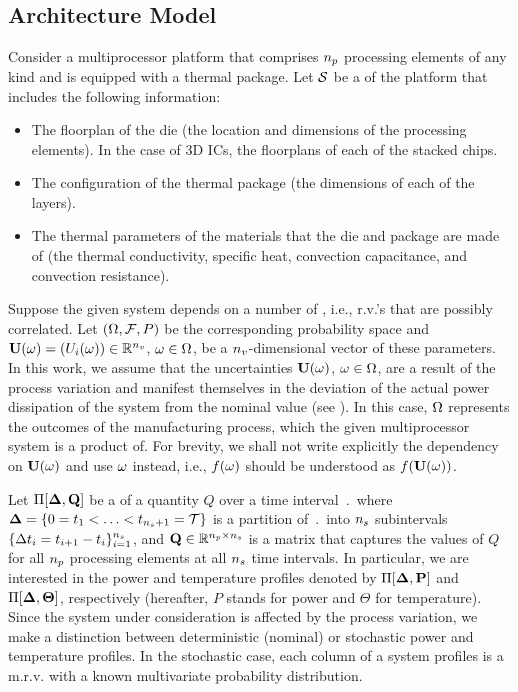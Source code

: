 \subsection{Architecture Model}  
Consider a multiprocessor platform that comprises ${n_p}$ processing elements of any kind and is equipped with a thermal package. Let $\mathcal{S}$ be a  of the platform that includes the following information:
\begin{itemize}
  \item The floorplan of the die (the location and dimensions of the processing elements). In the case of 3D ICs, the floorplans of each of the stacked chips.
  \item The configuration of the thermal package (the dimensions of each of the layers).
  \item The thermal parameters of the materials that the die and package are made of (the thermal conductivity, specific heat, convection capacitance, and convection resistance).
\end{itemize}

Suppose the given system depends on a number of , i.e., r.v.'s that are possibly correlated. Let $(\Omega, \mathcal{F}, P)$ be the corresponding probability space and $\vU(\o) = \vec{\param_i(\o)} \in \real^\vars$, $\omega \in \Omega$, be a ${n_v}$-dimensional vector of these parameters. In this work, we assume that the uncertainties $\vU(\o)$, $\omega \in \Omega$, are a result of the process variation and manifest themselves in the deviation of the actual power dissipation of the system from the nominal value (see ). In this case, $\Omega$ represents the outcomes of the manufacturing process, which the given multiprocessor system is a product of. For brevity, we shall not write explicitly the dependency on $\vU(\o)$ and use $\omega$ instead, i.e., $f(\omega)$ should be understood as $f(\vU(\o))$.

Let $\prof{\m{Q}}$ be a  of a quantity $Q$ over a time interval $\period$ where $\boldsymbol{\Delta} = \{ 0 = t_1 < \dotsc < t_{{n_s} + 1} = \mathcal{T} \}$ is a partition of $\period$ into ${n_s}$ subintervals $\{ \Delta t_i = t_{i+1} - t_i \}_{i = 1}^{{n_s}}$, and $\m{Q} \in \real^{\cores \times \steps}$ is a matrix that captures the values of $Q$ for all ${n_p}$ processing elements at all ${n_s}$ time intervals. In particular, we are interested in the power and temperature profiles denoted by $\prof{\mP}$ and $\Pi[\boldsymbol{\Delta}, {\boldsymbol\Theta}]$, respectively (hereafter, $P$ stands for power and $\Theta$ for temperature). Since the system under consideration is affected by the process variation, we make a distinction between deterministic (nominal) or stochastic power and temperature profiles. In the stochastic case, each column of a system profiles is a m.r.v. with a known multivariate probability distribution.

